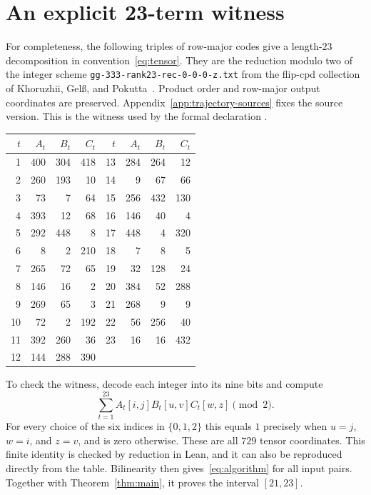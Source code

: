\clearpage
\section{An explicit 23-term witness}\label{app:upper}

For completeness, the following triples of row-major codes give a
length-$23$ decomposition in convention~\eqref{eq:tensor}. They are
the reduction modulo two of the integer scheme
\nolinkurl{gg-333-rank23-rec-0-0-0-z.txt} from the flip-cpd
collection of Khoruzhii, Gel{\ss}, and Pokutta~\cite{flip-cpd}.
Product order and row-major output coordinates are preserved.
Appendix~\ref{app:trajectory-sources} fixes the source version.
This is the witness used by the formal declaration
.

\begin{center}
\begin{tabular}{rrrr@{\qquad}rrrr}
\toprule
$t$ & $A_t$ & $B_t$ & $C_t$ & $t$ & $A_t$ & $B_t$ & $C_t$\\
\midrule
1 & 400 & 304 & 418 & 13 & 284 & 264 & 12\\
2 & 260 & 193 & 10 & 14 & 9 & 67 & 66\\
3 & 73 & 7 & 64 & 15 & 256 & 432 & 130\\
4 & 393 & 12 & 68 & 16 & 146 & 40 & 4\\
5 & 292 & 448 & 8 & 17 & 448 & 4 & 320\\
6 & 8 & 2 & 210 & 18 & 7 & 8 & 5\\
7 & 265 & 72 & 65 & 19 & 32 & 128 & 24\\
8 & 146 & 16 & 2 & 20 & 384 & 52 & 288\\
9 & 269 & 65 & 3 & 21 & 268 & 9 & 9\\
10 & 72 & 2 & 192 & 22 & 56 & 256 & 40\\
11 & 392 & 260 & 36 & 23 & 16 & 16 & 432\\
12 & 144 & 288 & 390 & & & &\\
\bottomrule
\end{tabular}
\end{center}

To check the witness, decode each integer into its nine bits and compute
\[
 \sum_{t=1}^{23} A_t[i,j]B_t[u,v]C_t[w,z]\pmod2.
\]
For every choice of the six indices in $\{0,1,2\}$ this equals
$1$ precisely when $u=j$, $w=i$, and $z=v$, and is zero otherwise.
These are all $729$ tensor coordinates. This finite identity is checked
by reduction in Lean, and it can also be reproduced directly from the
table. Bilinearity then gives~\eqref{eq:algorithm} for all input pairs.
Together with Theorem~\ref{thm:main}, it proves the interval $[21,23]$.
